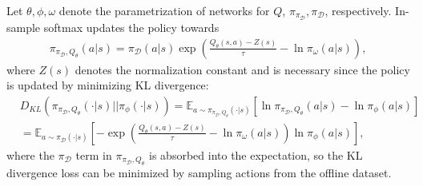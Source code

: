 \documentclass{article}
\newcommand{\AdaBracket}[1]{\left(#1\right)}
\newcommand{\AdaRectBracket}[1]{\left[#1\right]}
\newcommand{\expectation}[2]{\mathbb{E}_{#1}\AdaRectBracket{#2}}
\newcommand{\KLany}[2]{D_{\!K\!L}\!\left(#1 \left|  \right| #2 \right)}
\newcommand{\datasetPolicy}{\pi_{\mathcal{D}}}
\begin{document}
Let $\theta, \phi, \omega$ denote the parametrization of networks for $Q$, $\pi_{\datasetPolicy}, \datasetPolicy$, respectively.
In-sample softmax updates the policy towards 
\begin{align}
    \pi_{\datasetPolicy, Q_{\theta}}(a|s) = \datasetPolicy(a|s)\exp\AdaBracket{\frac{Q_{\theta}(s,a) - Z(s)}{\tau} - \ln \pi_{\omega}(a|s)},
    \label{eq:insample_policy}
\end{align}
where $Z(s)$ denotes the normalization constant and is necessary since the policy is updated by minimizing KL divergence:
\begin{align*}
    &\KLany{\pi_{\datasetPolicy, Q_{\theta}}(\cdot|s)}{\pi_{\phi}(\cdot | s)} = \expectation{a \sim \pi_{\datasetPolicy, Q_{\theta}}(\cdot|s) }{\ln \pi_{\datasetPolicy, Q_{\theta}}(a|s) - \ln \pi_{\phi}(a | s)} \\
    &= \expectation{a \sim \datasetPolicy(\cdot|s)}{ - \exp\AdaBracket{\frac{Q_{\theta}(s,a) - Z(s)}{\tau} - \ln \pi_{\omega}(a|s)} \ln\pi_{\phi}(a|s) },
\end{align*} 
where the $\datasetPolicy$ term in $ \pi_{\datasetPolicy, Q_{\theta}}$ is absorbed into the expectation, so the KL divergence loss can be minimized by sampling actions from the offline dataset.
\end{document}
